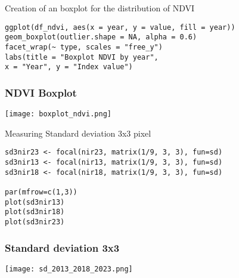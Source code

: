 \documentclass{beamer}
\begin{document}
\begin{frame}[fragile]{Creation of an boxplot for the distribution of NDVI}

\begin{lstlisting}
ggplot(df_ndvi, aes(x = year, y = value, fill = year))
geom_boxplot(outlier.shape = NA, alpha = 0.6) 
facet_wrap(~ type, scales = "free_y") 
labs(title = "Boxplot NDVI by year",
x = "Year", y = "Index value") 
\end{lstlisting}
\end{frame}


\begin{frame}
\frametitle{NDVI Boxplot}
\centering
\texttt{[image: boxplot\_ndvi.png]}
\end{frame}

\begin{frame}[fragile]{Measuring Standard deviation 3x3 pixel}

\begin{lstlisting}
sd3nir23 <- focal(nir23, matrix(1/9, 3, 3), fun=sd)
sd3nir13 <- focal(nir13, matrix(1/9, 3, 3), fun=sd)
sd3nir18 <- focal(nir18, matrix(1/9, 3, 3), fun=sd)

par(mfrow=c(1,3))
plot(sd3nir13)
plot(sd3nir18)
plot(sd3nir23)
\end{lstlisting}
\end{frame}

\begin{frame}
\frametitle{Standard deviation 3x3}
\centering
\texttt{[image: sd\_2013\_2018\_2023.png]}
\end{frame}
\end{document}
